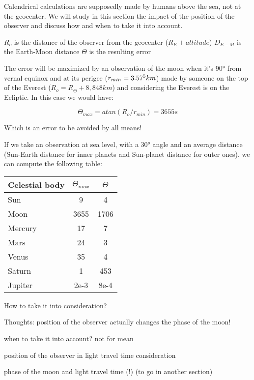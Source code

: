 
Calendrical calculations are supposedly made by humans above the sea, not at the geocenter. We will study in this section the impact of the position of the observer and discuss how and when to take it into account.


$R_o$ is the distance of the observer from the geocenter ($R_E+altitude$)
$D_{E-M}$ is the Earth-Moon distance
$\Theta$ is the resulting error

The error will be maximized by an observation of the moon when it's $90°$ from vernal equinox and at its perigee ($r_{min}=3.57\time 10^5 km$) made by someone on the top of the Everest ($R_o=R_{\oplus}+8,848 km$) and considering the Everest is on the Ecliptic. In this case we would have:

$$\Theta_{max} = atan(R_o/r_{min}) = 3655s$$


Which is an error to be avoided by all means!

If we take an observation at sea level, with a $30°$ angle and an average distance (Sun-Earth distance for inner planets and Sun-planet distance for outer ones), we can compute the following table:

\begin{center}
\begin{tabular}{|l|S|S|}
\hline
\textbf{Celestial body} &  &   \\\hline
Sun & 9 & 4\\\hline %
Moon & 3655 & 1706\\\hline %
Mercury & 17 & 7\\\hline %
Mars & 24 & 3\\\hline %
Venus & 35 & 4\\\hline %
Saturn & 1 & 453\\\hline %
Jupiter & 2e-3 & 8e-4 \\\hline %
\end{tabular}
\end{center}

How to take it into consideration?

Thoughts: position of the observer actually changes the phase of the moon!

when to take it into account? not for mean

position of the observer in light travel time consideration

phase of the moon and light travel time (!) (to go in another section)
